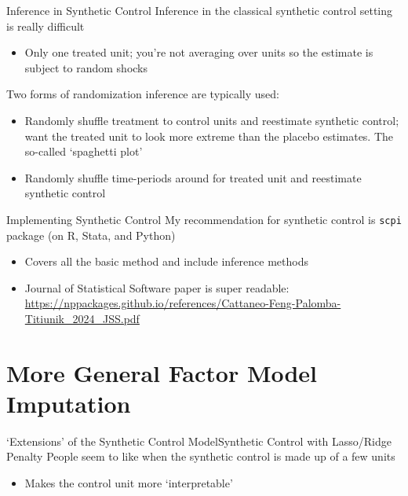 \documentclass[t]{beamer}
\begin{document}
\begin{frame}{Inference in Synthetic Control}
  Inference in the classical synthetic control setting is really difficult
  \begin{itemize}
    \item Only one treated unit; you're not averaging over units so the estimate is subject to random shocks
  \end{itemize}

  \pause
  \bigskip
  Two forms of randomization inference are typically used:
  \begin{itemize}
    \item Randomly shuffle treatment to control units and reestimate synthetic control; want the treated unit to look more extreme than the placebo estimates. The so-called `spaghetti plot'

    \item Randomly shuffle time-periods around for treated unit and reestimate synthetic control
  \end{itemize}
\end{frame}

\begin{frame}{Implementing Synthetic Control}
  My recommendation for synthetic control is \texttt{scpi} package (on R, Stata, and Python)
  \begin{itemize}
    \item Covers all the basic method and include inference methods

    \item Journal of Statistical Software paper is super readable: \url{https://nppackages.github.io/references/Cattaneo-Feng-Palomba-Titiunik_2024_JSS.pdf}
  \end{itemize}

\end{frame}


\section{More General Factor Model Imputation}

\begin{frame}{`Extensions' of the Synthetic Control Model}{Synthetic Control with Lasso/Ridge Penalty}
  People seem to like when the synthetic control is made up of a few units
  \begin{itemize}
    \item Makes the control unit more `interpretable'
  \end{itemize}
\end{frame}
\end{document}
